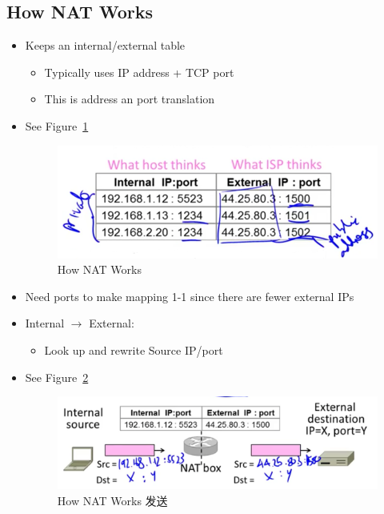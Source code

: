 \documentclass[12pt]{ctexart}   %
\begin{document}
	\subsection{How NAT Works}
	\begin{itemize}
		\item Keeps an internal/external table
		\begin{itemize}
			\item Typically uses IP address + TCP port
			\item This is address an port translation
		\end{itemize}
		\item See Figure~\ref{fig:4-10-4}
		
		\begin{figure}[h!] %
		\centering
		 \includegraphics[scale=0.7]{images/4-10-4}
		\caption{ How NAT Works }
		 \label{fig:4-10-4}
		 \end{figure}
		 
		 \item Need ports to make mapping 1-1 since there are fewer external IPs
		 
		 \item Internal $\rightarrow$ External:
		 \begin{itemize}
		 	\item Look up and rewrite Source IP/port
		 \end{itemize}
		 \item See Figure~\ref{fig:4-10-5}
		
		\begin{figure}[h!] %
		\centering
		 \includegraphics[scale=0.7]{images/4-10-5}
		\caption{ How NAT Works 发送 }
		 \label{fig:4-10-5}
		 \end{figure}
		 

\end{itemize}
\end{document}
